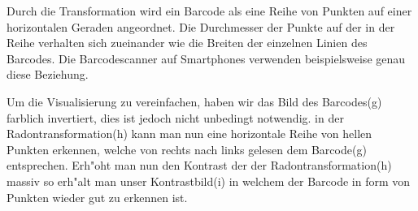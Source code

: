 \begin{figure}[ht!]\centering
\end{figure}
\FloatBarrier
    
Durch die Transformation wird ein Barcode als eine Reihe von Punkten
auf einer horizontalen Geraden angeordnet. Die Durchmesser der Punkte
auf der in der Reihe verhalten sich zueinander wie die Breiten der
einzelnen Linien des Barcodes. Die Barcodescanner auf Smartphones
verwenden beispielsweise genau diese Beziehung.

Um die Visualisierung zu vereinfachen, haben wir das Bild des Barcodes(g)
farblich invertiert, dies ist jedoch nicht unbedingt notwendig. in der
Radontransformation(h) kann man nun eine horizontale Reihe von hellen
Punkten erkennen, welche von rechts nach links gelesen dem Barcode(g)
entsprechen. Erh"oht man nun den Kontrast der der Radontransformation(h)
massiv so erh"alt man unser Kontrastbild(i) in welchem der Barcode in
form von Punkten wieder gut zu erkennen ist.

